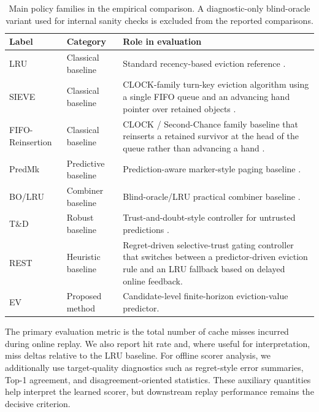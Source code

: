 \documentclass[preprint,12pt]{elsarticle}
\begin{document}
\begin{table}[!htbp]
\centering
\caption{Main policy families in the empirical comparison. A diagnostic-only blind-oracle variant used for internal sanity checks is excluded from the reported comparisons.}
\label{tab:main_policy_families}
\small
\begin{tabular}{p{2.2cm} p{2.3cm} p{6.6cm}}
\hline
\textbf{Label} & \textbf{Category} & \textbf{Role in evaluation} \\
\hline
LRU & Classical baseline & Standard recency-based eviction reference \cite{belady1966replacement_algorithms}. \\
SIEVE & Classical baseline & CLOCK-family turn-key eviction algorithm using a single FIFO queue and an advancing hand pointer over retained objects \cite{zhang2024sieve}. \\
FIFO-Reinsertion & Classical baseline & CLOCK / Second-Chance family baseline that reinserts a retained survivor at the head of the queue rather than advancing a hand \cite{zhang2024sieve}. \\
PredMk & Predictive baseline & Prediction-aware marker-style paging baseline \cite{lykouris2021competitive_caching}. \\
BO/LRU & Combiner baseline & Blind-oracle/LRU practical combiner baseline \cite{wei2020better_simpler_lac}. \\
T\&D & Robust baseline & Trust-and-doubt-style controller for untrusted predictions \cite{antoniadis2020online_metric_untrusted}. \\
REST & Heuristic baseline & Regret-driven selective-trust gating controller that switches between a predictor-driven eviction rule and an LRU fallback based on delayed online feedback. \\
EV & Proposed method & Candidate-level finite-horizon eviction-value predictor. \\
\hline
\end{tabular}
\end{table}

The primary evaluation metric is the total number of cache misses incurred during online replay. We also report hit rate and, where useful for interpretation, miss deltas relative to the LRU baseline. For offline scorer analysis, we additionally use target-quality diagnostics such as regret-style error summaries, Top-1 agreement, and disagreement-oriented statistics. These auxiliary quantities help interpret the learned scorer, but downstream replay performance remains the decisive criterion.
\end{document}
